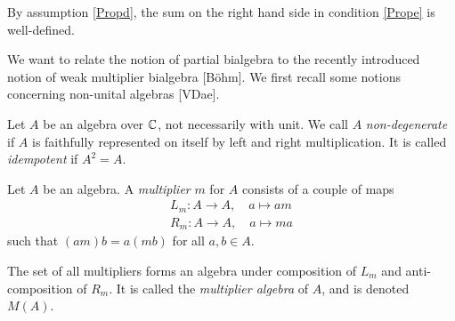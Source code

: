 
\begin{Rem} By assumption \ref{Propd}, the sum on the right hand side in condition \ref{Prope} is well-defined. 
\end{Rem}


We want to relate the notion of partial bialgebra to the recently introduced notion of weak multiplier bialgebra [B\"{o}hm]. We first recall some notions concerning non-unital algebras [VDae].

\begin{Def} Let $A$ be an algebra over $\mathbb{C}$, not necessarily with unit. We call $A$ \emph{non-degenerate} if $A$ is faithfully represented on itself by left and right multiplication. It is called \emph{idempotent} if $A^2 = A$. 
\end{Def}

\begin{Def} Let $A$ be an algebra. A \emph{multiplier} $m$ for $A$ consists of a couple of maps \begin{eqnarray*} L_m:A\rightarrow A,\quad a\mapsto am\\ R_m:A\rightarrow A,\quad a\mapsto ma\end{eqnarray*} such that $(am)b = a(mb)$ for all $a,b\in A$. 

The set of all multipliers forms an algebra under composition of $L_m$ and anti-composition of $R_m$. It is called the \emph{multiplier algebra} of $A$, and is denoted $M(A)$.
\end{Def}

